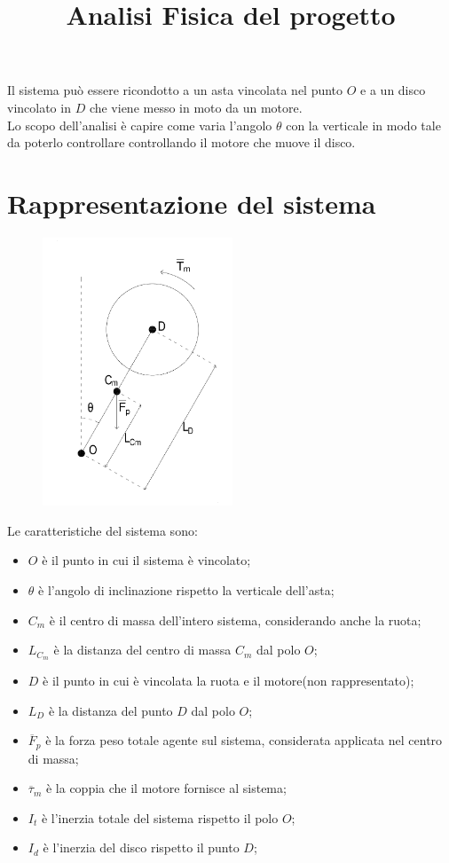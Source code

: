 \documentclass[12pt,a4paper,twoside, openright]{scrartcl}
\title{Analisi Fisica del progetto}
\date{\vspace{-5ex}}
\begin{document}
	\pagestyle{plain}
	\maketitle
	Il sistema può essere ricondotto a un asta vincolata nel punto  $O$ e a un disco vincolato in $D$ che viene messo in moto da un motore.\\ 
	Lo scopo dell'analisi è capire come varia l'angolo $\theta$ con la verticale in modo tale da poterlo controllare controllando il motore che muove il disco.
\section{Rappresentazione del sistema}
		\begin{figure}[H]
			\begin{center}
				\includegraphics[height=8cm]{Sorgenti/Figura1.pdf}
			\end{center}
			\label{fig:struttura}
		\end{figure}
	Le caratteristiche del sistema sono:
	\begin{itemize}
		\item $O$ è il punto in cui il sistema è vincolato;
		\item $\theta$ è l'angolo di inclinazione rispetto la verticale dell'asta;
		\item $C_m$ è il centro di massa dell'intero sistema, considerando anche la ruota;
		\item $L_{C_m}$ è la distanza del centro di massa $C_m$ dal polo $O$; 
		\item $D$ è il punto in cui è vincolata la ruota e il motore(non rappresentato);
		\item $L_D$ è la distanza del punto $D$ dal polo $O$; 
		\item $\overline{F}_p$ è la forza peso totale agente sul sistema, considerata applicata nel centro di massa;
		\item $ \overline{\tau}_m$ è la coppia che il motore fornisce al sistema;
		\item $I_t$ è l'inerzia totale del sistema rispetto il polo $O$;
		\item $I_d$ è l'inerzia del disco rispetto il punto $D$;
	\end{itemize}
\end{document}
